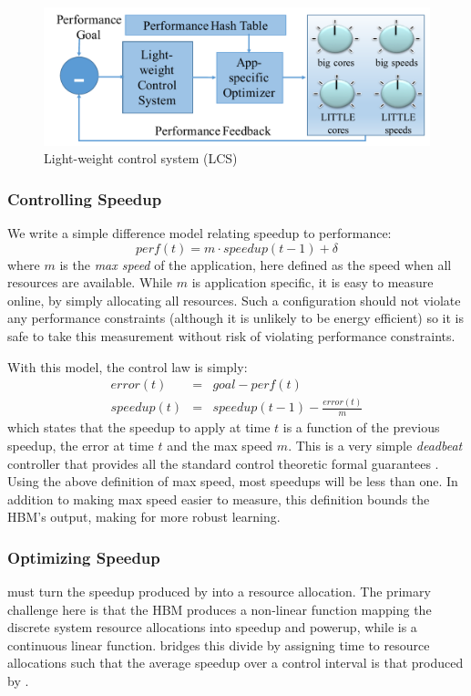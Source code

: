 \begin{figure}
\includegraphics[width=\columnwidth]{figures/LCS.pdf}
\caption{Light-weight control system (LCS) }
  \label{fig:framework:lcs}
\end{figure}


\subsubsection{Controlling Speedup}
We write a simple difference model relating speedup to performance:
\begin{equation}
  perf(t) = m \cdot speedup(t-1) + \delta \label{eqn:speedup}
\end{equation}
where $m$ is the \emph{max speed} of the application, here defined as
the speed when all resources are available.  While $m$ is application
specific, it is easy to measure online, by simply allocating all
resources. Such a configuration should not violate any performance
constraints (although it is unlikely to be energy efficient) so it is
safe to take this measurement without risk of violating performance
constraints.

With this model, the control law is simply:
\begin{eqnarray}
  error(t) &=& goal - perf(t) \label{eqn:speedup-error} \\
  speedup(t) &=& speedup(t-1) - \frac{error(t)}{m}
  \label{eqn:speedup-control}
\end{eqnarray}
which states that the speedup to apply at time $t$ is a function of
the previous speedup, the error at time $t$ and the max speed $m$.
This is a very simple \emph{deadbeat} controller that provides all the
standard control theoretic formal guarantees \cite{Hellerstein2004a}.
Using the above definition of max speed, most speedups will be less
than one.  In addition to making max speed easier to measure, this
definition bounds the HBM's output, making for more robust learning.

\subsubsection{Optimizing Speedup}
\SYSTEM{} must turn the speedup produced by 
into a resource allocation.  The primary challenge here is that
the HBM produces a non-linear
function mapping the discrete system resource allocations into speedup and powerup,
while  is a continuous linear function.
\SYSTEM{} bridges this divide by assigning time to resource
allocations such that the average speedup over a control interval is
that produced by .

